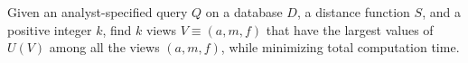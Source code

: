 \begin{problem}
\vspace{-5pt}
Given an analyst-specified query $Q$ on a database $D$, a distance function $S$,
and a positive integer $k$, find $k$ views $V \equiv (a, m, f)$ that
have the largest values of $U(V)$ among all the views $(a, m, f)$, 
while minimizing total computation time.
\vspace{-5pt}
\end{problem}





